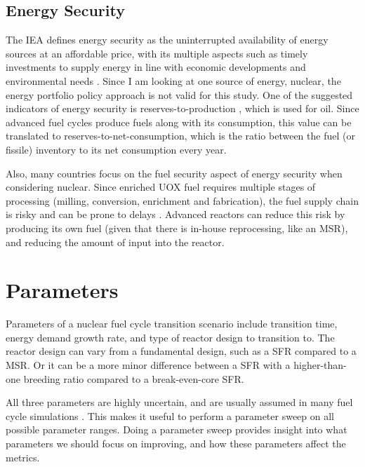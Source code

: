 \subsection{Energy Security}
The \gls{IEA} defines energy security as the uninterrupted
availability of energy sources at an affordable price, with
its multiple aspects such as timely investments to supply
energy in line with economic developments and environmental
needs \cite{lefevre-marton_energy_2005}. Since I am looking
at one source of energy, nuclear, the energy portfolio policy
approach \cite{winzer_conceptualizing_2012,
lefevre-marton_energy_2005} is not valid for this study.
One of the suggested indicators of energy security is reserves-to-production
\cite{feygin_oil_2004}, which is used for oil. Since advanced
fuel cycles produce fuels along with its consumption, this
value can be translated to reserves-to-net-consumption, which is
the ratio between the fuel (or fissile) inventory to its
net consumption every year.

Also, many countries focus on the fuel security aspect
of energy security when considering nuclear. Since enriched
\gls{UOX} fuel requires multiple stages of processing
(milling, conversion, enrichment and fabrication),
the fuel supply chain is risky and can be prone to delays
\cite{association_ensuring_2006}. Advanced reactors can
reduce this risk by producing its own fuel (given
that there is in-house reprocessing, like an \gls{MSR}),
and reducing the amount of input into the reactor.

\section{Parameters}
Parameters of a nuclear fuel cycle transition scenario
include transition time, energy demand growth rate,
and type of reactor design to transition to. The reactor
design can vary from a fundamental design, such as
a \gls{SFR} compared to a \gls{MSR}. Or it can be a
more minor difference between a \gls{SFR} with a
higher-than-one breeding ratio compared to a
break-even-core \gls{SFR}.

All three parameters are highly uncertain, and are
usually assumed in many fuel cycle simulations \cite{worrall_utilization_2013, chen_prospects_2018}
. This makes it
useful to perform a parameter sweep on all possible
parameter ranges. Doing a parameter sweep provides
insight into what parameters we should focus on improving,
and how these parameters affect the metrics.
